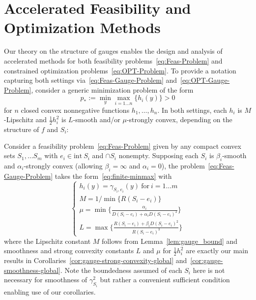 \documentclass[sn-mathphys,Numbered]{sn-jnl}%
\begin{document}
\section{Accelerated Feasibility and Optimization Methods} \label{sec:algs}
Our theory on the structure of gauges enables the design and analysis of accelerated methods for both feasibility problems~\eqref{eq:Feas-Problem} and constrained optimization problems~\eqref{eq:OPT-Problem}. To provide a notation capturing both settings via~\eqref{eq:Feas-Gauge-Problem} and~\eqref{eq:OPT-Gauge-Problem}, consider a generic minimization problem of the form
\begin{equation} \label{eq:finite-minmax}
    p_* := \min_y \max_{i=1\dots n}\{h_i(y)\} >0
\end{equation}
for $n$ closed convex nonnegative functions $h_1,\dots, h_n$. In both settings, each $h_i$ is $M$-Lipschitz and $\frac{1}{2}h_i^2$ is $L$-smooth and/or $\mu$-strongly convex, depending on the structure of $f$ and $S_i$:

Consider a feasibility problem~\eqref{eq:Feas-Problem} given by any compact convex sets $S_1,\dots S_m$ with $e_i\in \mathrm{int\ } S_i$ and $\cap S_i$ nonempty. Supposing each $S_i$ is $\beta_i$-smooth and $\alpha_i$-strongly convex (allowing $\beta_i=\infty$ and $\alpha_i=0$), the problem~\eqref{eq:Feas-Gauge-Problem} takes the form~\eqref{eq:finite-minmax} with
\begin{equation} \label{eq:feas-constants}
    \begin{cases} 
        h_i(y) = \gamma_{S_{i},e_i}(y) \mathrm{\ for\ }i=1\dots m\\
        M = 1/\min\{R(S_i - e_i)\}\\
        \mu = \min\{\frac{\alpha_i}{D(S_i - e_i)+\alpha_i D(S_i - e_i)^2}\}\\
        L = \max\{\frac{R(S_i - e_i)+\beta_i D(S_i - e_i)^2}{R(S_i - e_i)^3}\}
        \end{cases}
\end{equation}
where the Lipschitz constant $M$ follows from Lemma~\ref{lem:gauge_bound} and smoothness and strong convexity constants $L$ and $\mu$ for $\frac{1}{2}h_i^2$ are exactly our main results in Corollaries~\ref{cor:gauge-strong-convexity-global} and~\ref{cor:gauge-smoothness-global}. Note the boundedness assumed of each $S_i$ here is not necessary for smoothness of $\gamma_{S_i}^2$ but rather a convenient sufficient condition enabling use of our corollaries.
\end{document}
